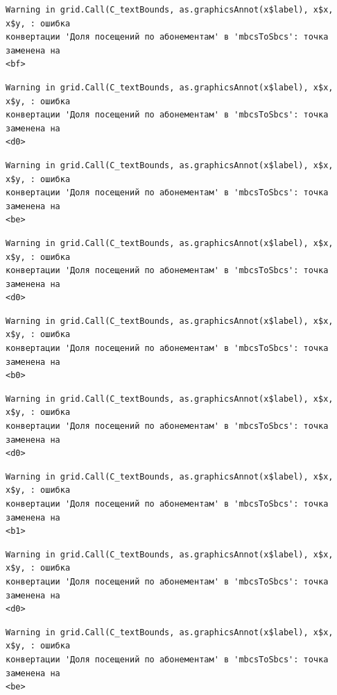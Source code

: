 \documentclass[
  letterpaper,
  DIV=11,
  numbers=noendperiod]{scrreprt}
\begin{document}
\begin{verbatim}
Warning in grid.Call(C_textBounds, as.graphicsAnnot(x$label), x$x, x$y, : ошибка
конвертации 'Доля посещений по абонементам' в 'mbcsToSbcs': точка заменена на
<bf>
\end{verbatim}

\begin{verbatim}
Warning in grid.Call(C_textBounds, as.graphicsAnnot(x$label), x$x, x$y, : ошибка
конвертации 'Доля посещений по абонементам' в 'mbcsToSbcs': точка заменена на
<d0>
\end{verbatim}

\begin{verbatim}
Warning in grid.Call(C_textBounds, as.graphicsAnnot(x$label), x$x, x$y, : ошибка
конвертации 'Доля посещений по абонементам' в 'mbcsToSbcs': точка заменена на
<be>
\end{verbatim}

\begin{verbatim}
Warning in grid.Call(C_textBounds, as.graphicsAnnot(x$label), x$x, x$y, : ошибка
конвертации 'Доля посещений по абонементам' в 'mbcsToSbcs': точка заменена на
<d0>
\end{verbatim}

\begin{verbatim}
Warning in grid.Call(C_textBounds, as.graphicsAnnot(x$label), x$x, x$y, : ошибка
конвертации 'Доля посещений по абонементам' в 'mbcsToSbcs': точка заменена на
<b0>
\end{verbatim}

\begin{verbatim}
Warning in grid.Call(C_textBounds, as.graphicsAnnot(x$label), x$x, x$y, : ошибка
конвертации 'Доля посещений по абонементам' в 'mbcsToSbcs': точка заменена на
<d0>
\end{verbatim}

\begin{verbatim}
Warning in grid.Call(C_textBounds, as.graphicsAnnot(x$label), x$x, x$y, : ошибка
конвертации 'Доля посещений по абонементам' в 'mbcsToSbcs': точка заменена на
<b1>
\end{verbatim}

\begin{verbatim}
Warning in grid.Call(C_textBounds, as.graphicsAnnot(x$label), x$x, x$y, : ошибка
конвертации 'Доля посещений по абонементам' в 'mbcsToSbcs': точка заменена на
<d0>
\end{verbatim}

\begin{verbatim}
Warning in grid.Call(C_textBounds, as.graphicsAnnot(x$label), x$x, x$y, : ошибка
конвертации 'Доля посещений по абонементам' в 'mbcsToSbcs': точка заменена на
<be>
\end{verbatim}
\end{document}
